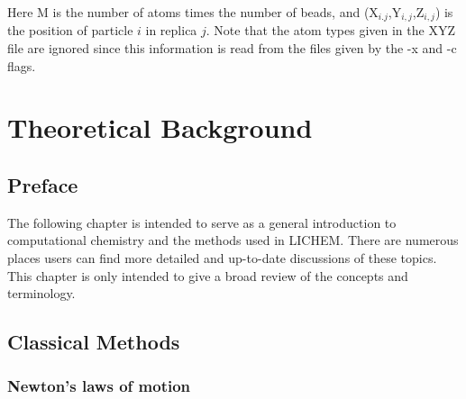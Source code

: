 \documentclass[12pt]{report}
\begin{document}
Here M is the number of atoms times the number of beads, and 
(X$_{i.j}$,Y$_{i,j}$,Z$_{i,j}$) is the position of particle $i$ in replica
$j$. Note that the atom types given in the XYZ file are ignored since this
information is read from the files given by the -x and -c flags.

\chapter{Theoretical Background}
\label{chap:Theory}

\section{Preface}

The following chapter is intended to serve as a general introduction to
computational chemistry and the methods used in LICHEM. There are numerous
places users can find more detailed and up-to-date discussions of these
topics. This chapter is only intended to give a broad review of the concepts
and terminology.

\section{Classical Methods}

\subsection{Newton's laws of motion}
\end{document}
